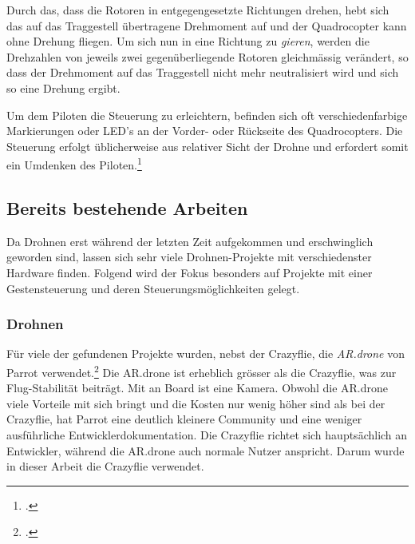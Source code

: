 Durch das, dass die Rotoren in entgegengesetzte Richtungen drehen, hebt sich das auf das Traggestell übertragene Drehmoment auf und der Quadrocopter kann ohne Drehung fliegen.
Um sich nun in eine Richtung zu \textit{gieren}, werden die Drehzahlen von jeweils zwei gegenüberliegende Rotoren gleichmässig verändert, so dass der Drehmoment auf das Traggestell nicht mehr neutralisiert wird und sich so eine Drehung ergibt.

Um dem Piloten die Steuerung zu erleichtern, befinden sich oft verschiedenfarbige Markierungen oder LED's an der Vorder- oder Rückseite des Quadrocopters.
Die Steuerung erfolgt üblicherweise aus relativer Sicht der Drohne und erfordert somit ein Umdenken des Piloten.\footcite{Quadrocopter__Wikipedia_2015-03-22}


\subsection{Bereits bestehende Arbeiten}
Da Drohnen erst während der letzten Zeit aufgekommen und erschwinglich geworden sind, lassen sich sehr viele Drohnen-Projekte mit verschiedenster Hardware finden.
Folgend wird der Fokus besonders auf Projekte mit einer Gestensteuerung und deren Steuerungsmöglichkeiten gelegt.


\subsubsection{Drohnen}
Für viele der gefundenen Projekte wurden, nebst der Crazyflie, die \textit{AR.drone} von Parrot verwendet.\footcite{AR_Drone_2.0_Parrot_2015-04-29}
Die AR.drone ist erheblich grösser als die Crazyflie, was zur Flug-Stabilität beiträgt.
Mit an Board ist eine Kamera.
Obwohl die AR.drone viele Vorteile mit sich bringt und die Kosten nur wenig höher sind als bei der Crazyflie, hat Parrot eine deutlich kleinere Community und eine weniger ausführliche Entwicklerdokumentation.
Die Crazyflie richtet sich hauptsächlich an Entwickler, während die AR.drone auch normale Nutzer anspricht.
Darum wurde in dieser Arbeit die Crazyflie verwendet.

